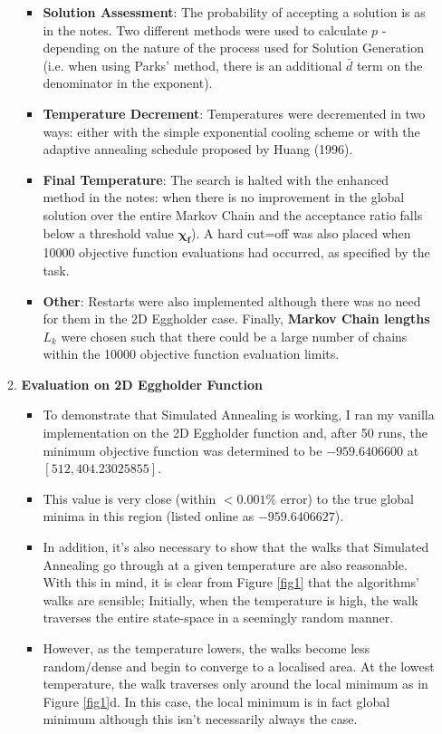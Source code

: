 \documentclass[12pt]{article}
\begin{document}
\begin{enumerate}
\begin{enumerate}
\begin{itemize}
		\item \textbf{Solution Assessment}: The probability of accepting a solution is as in the notes. Two different methods were used to calculate $p$ - depending on the nature of the process used for Solution Generation (i.e. when using Parks' method, there is an additional $\bar{d}$ term on the denominator in the exponent).
		\item \textbf{Temperature Decrement}: Temperatures were decremented in two ways: either with the simple exponential cooling scheme or with the adaptive annealing schedule proposed by Huang (1996).
		\item \textbf{Final Temperature}: The search is halted with the enhanced method in the notes: when there is no improvement in the global solution over the entire Markov Chain and the acceptance ratio falls below a threshold value $\bm{\chi_{f}}$). A hard cut=off was also placed when 10000 objective function evaluations had occurred, as specified by the task. 
		\item \textbf{Other}: Restarts were also implemented although there was no need for them in the 2D Eggholder case. Finally, \textbf{Markov Chain lengths} $L_{k}$ were chosen such that there could be a large number of chains within the 10000 objective function evaluation limits.
	\end{itemize}
	\item \textbf{Evaluation on 2D Eggholder Function}
	\begin{itemize}
		\item To demonstrate that Simulated Annealing is working, I ran my vanilla implementation on the 2D Eggholder function and, after 50 runs, the minimum objective function was determined to be $-959.6406600$ at $[512, 404.23025855]$. 
		\item This value is very close (within $< 0.001\%$ error) to the true global minima in this region (listed online as $−959.6406627$).
		\item In addition, it's also necessary to show that the walks that Simulated Annealing go through at a given temperature are also reasonable. With this in mind, it is clear from Figure \ref{fig1} that the algorithms' walks are sensible; Initially, when the temperature is high, the walk traverses the entire state-space in a seemingly random manner.
		\item However, as the temperature lowers, the walks become less random/dense and begin to converge to a localised area. At the lowest temperature, the walk traverses only  around the local minimum as in Figure \ref{fig1}d. In this case, the local minimum is in fact global minimum although this isn't necessarily always the case. 

\end{itemize}
\end{enumerate}
\end{enumerate}
\end{document}
